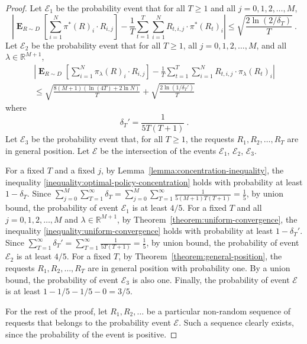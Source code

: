 \documentclass[12pt]{article}
\newcommand{\R}{\mathbb{R}}
\newcommand{\E}{\mathcal{E}}
\DeclareMathOperator*{\Exp}{\mathbf{E}}
\theoremstyle{definition}
\begin{document}
\begin{proof}
Let $\E_1$ be the probability event that for all $T \ge 1$ and all
$j=0,1,2,\dots,M$,
\begin{equation}
\label{inequality:optimal-policy-concentration}
\left| \Exp_{R \sim D} \left[ \sum_{i=1}^N \pi^*(R)_i \cdot R_{i,j} \right] - \frac{1}{T} \sum_{t=1}^T \sum_{i=1}^N R_{t,i,j} \cdot \pi^*(R_t)_i  \right|
\le \sqrt{ \frac{2\ln(2/\delta_T)}{T}} \: .
\end{equation}
Let $\E_2$ be the probability event that for all $T \ge 1$,
all $j=0,1,2,\dots,M$, and all $\lambda \in \R^{M+1}$,
\begin{multline}
\label{inequality:uniform-convergence}
\left| \Exp_{R \sim D} \left[ \sum_{i=1}^N \pi_\lambda(R)_i \cdot R_{i,j}  \right]  -  \frac{1}{T} \sum_{t=1}^T \sum_{i=1}^N R_{t,i,j} \cdot \pi_\lambda(R_t)_i  \right|
\\
\le \sqrt{\frac{8(M+1) (\ln(4T) + 2 \ln N)}{T}} + \sqrt{ \frac{2\ln(1/\delta_T')}{T} }
\end{multline}
where
$$
\delta_T' = \frac{1}{5 T(T+1)} \: .
$$
Let $\E_3$ be the probability event that, for all $T \ge 1$, the requests $R_1,
R_2,\dots,R_T$ are in general position. Let $\E$ be the intersection of the
events $\E_1$, $\E_2$, $\E_3$.

For a fixed $T$ and a fixed $j$, by Lemma~\ref{lemma:concentration-inequality},
the inequality \eqref{inequality:optimal-policy-concentration} holds with
probability at least $1 - \delta_T$. Since $\sum_{j=0}^M \sum_{T=1}^\infty
\delta_T = \sum_{j=0}^M \sum_{T=1}^\infty \frac{1}{5(M+1) T(T+1)} =
\frac{1}{5}$, by union bound, the probability of event $\E_1$ is at least $4/5$.
For a fixed $T$ and all $j=0,1,2,\dots,M$ and $\lambda \in \R^{M+1}$, by
Theorem~\ref{theorem:uniform-convergence}, the inequality
\eqref{inequality:uniform-convergence} holds with probability at least $1 -
\delta_T'$. Since $\sum_{T=1}^\infty \delta_T' = \sum_{T=1}^\infty
\frac{1}{5 T(T+1)} = \frac{1}{5}$, by union bound, the probability of event
$\E_2$ is at least $4/5$. For a fixed $T$, by
Theorem~\ref{theorem:general-position}, the requests $R_1, R_2,\dots,R_T$ are in
general position with probability one. By a union bound, the probability of
event $\E_3$ is also one. Finally, the probability of event $\E$ is at least $1
- 1/5 - 1/5 - 0 = 3/5$.

For the rest of the proof, let $R_1, R_2, \dots$ be a particular non-random
sequence of requests that belongs to the probability event $\E$. Such a sequence
clearly exists, since the probability of the event is positive.


\end{proof}
\end{document}
